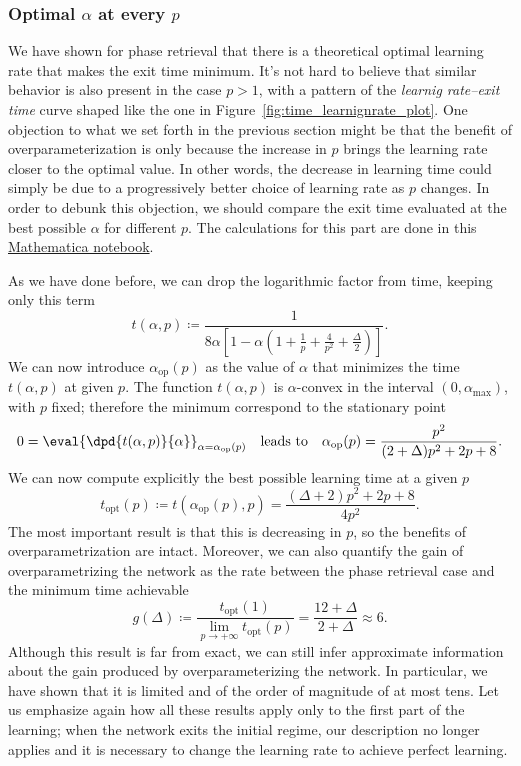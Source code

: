 \subsubsection{Optimal $\alpha$ at every $p$}
We have shown for phase retrieval that there is a theoretical optimal learning rate that makes the exit time minimum.
It's not hard to believe that similar behavior is also present in the case \(p>1\),
with a pattern of the \emph{learnig rate--exit time} curve shaped like the one in Figure~\ref{fig:time_learnignrate_plot}.
One objection to what we set forth in the previous section might be that the benefit of overparameterization is only because the increase in \(p\) brings the learning rate closer to the optimal value.
In other words, the decrease in learning time could simply be due to a progressively better choice of learning rate as \(p\) changes.
In order to debunk this objection, we should compare the exit time evaluated at the best possible \(\alpha\) for different \(p\).
The calculations for this part are done in this \href{https://github.com/arn4/master-thesis/blob/main/analytical-calculations%20/optimizing-alpha-k%3D1.nb}{Mathematica notebook}.

As we have done before, we can drop the logarithmic factor from time, keeping only this term
\[
  t{(\alpha,p)} \coloneqq \frac{1}{8\alpha\left[1- \alpha\left(1+\frac{1}{p}+\frac{4}{p^2}+\frac{\Delta}{2}\right)\right]}.
\]
We can now introduce \(\alpha_\text{op}(p)\) as the value of \(\alpha\) that minimizes the time \(t{(\alpha,p)}\) at given \(p\). 
The function \(t{(\alpha,p)}\) is \(\alpha\)-convex in the interval \((0,\alpha_\text{max})\), with \(p\) fixed;
therefore the minimum correspond to the stationary point
\[
  0 = \eval{\dpd{t{(\alpha,p)}}{\alpha}}_{\alpha = \alpha_\text{op}(p)} \quad\text{leads to}\quad 
  \alpha_\text{op}(p) = \frac{p^2}{(2+\Delta)p^2+2 p+8}.
\]
We can now compute explicitly the best possible learning time at a given \(p\)
\[
  t_\text{opt}{(p)} \coloneqq t{\left(\alpha_\text{op}(p),p\right)} = \frac{(\Delta +2) p^2+2p+8}{4 p^2}.
\]
The most important result is that this is decreasing in \(p\), so the benefits of overparametrization are intact.
Moreover, we can also quantify the gain of overparametrizing the network as the rate between the phase retrieval case
and the minimum time achievable
\[
  g{(\Delta)} \coloneqq \frac{t_\text{opt}{(1)}}{\lim_{p\to+\infty}t_\text{opt}{(p)}} = \frac{12+\Delta}{2+\Delta} \approx 6.
\]
Although this result is far from exact, we can still infer approximate information about the gain produced by overparameterizing the network.
In particular, we have shown that it is limited and of the order of magnitude of at most tens.
Let us emphasize again how all these results apply only to the first part of the learning;
when the network exits the initial regime, our description no longer applies and it is necessary to change the learning rate to achieve perfect learning.


